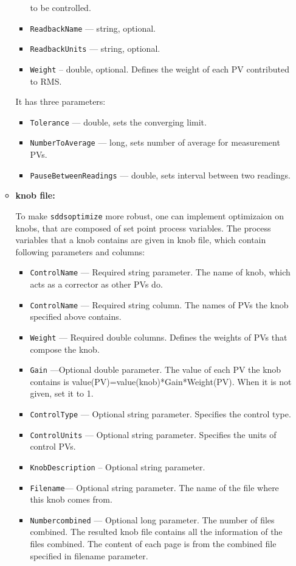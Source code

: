 \begin{itemize}
\begin{itemize}
\begin{itemize}
                 to be controlled.
        \item {\tt ReadbackName} --- string, optional.
        \item {\tt ReadbackUnits} --- string, optional.
        \item {\tt Weight} -- double, optional. Defines the weight of each PV contributed to RMS.
\end{itemize}
It has three parameters: 
\begin{itemize}
        \item {\tt Tolerance} --- double, sets the converging limit.
        \item {\tt NumberToAverage} --- long, sets number of average for measurement PVs.
        \item {\tt PauseBetweenReadings} --- double, sets interval between two readings.

\end{itemize}

\item {\bf knob file:} \par
To make \verb+sddsoptimize+ more robust, one can implement optimizaion on knobs,
that are composed of set point process variables. The process variables that a knob contains are
given in knob file, which contain following parameters and columns:
\begin{itemize}
        \item {\tt ControlName} --- Required string parameter. The name of knob, which
                acts as a corrector as other PVs do.
        \item {\tt ControlName} --- Required string column. The names of PVs the knob
                specified above contains.
        \item {\tt Weight} --- Required double columns. Defines the weights of PVs that
                compose the knob.
        \item {\tt Gain} ---Optional double parameter. The value of each PV the knob contains
                is value(PV)=value(knob)*Gain*Weight(PV). When it is not given, set it to 1.
        \item {\tt ControlType} --- Optional string parameter. Specifies the control type.
        \item {\tt ControlUnits}  --- Optional string parameter.
                 Specifies the units of control PVs.
        \item {\tt KnobDescription} -- Optional string parameter.
        \item {\tt Filename}--- Optional string parameter. The name of the file where 
                this knob comes from.
        \item {\tt Numbercombined} --- Optional long parameter. The number of files combined.
                The resulted knob file contains all the information of the files combined.
                The content of each page is from the combined file specified in filename parameter.
\end{itemize}


\end{itemize}
\end{itemize}
